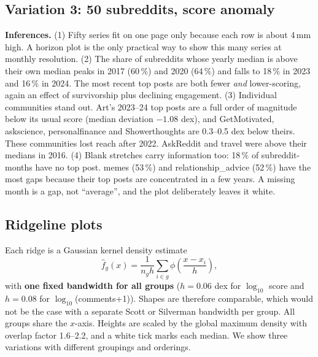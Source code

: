 \subsection{Variation 3: 50 subreddits, score anomaly}

\textbf{Inferences.}
(1) Fifty series fit on one page only because each row is about 4\,mm high. A horizon plot is the only practical way to
show this many series at monthly resolution.
(2) The share of subreddits whose yearly median is above their own median peaks in 2017 (60\,\%) and 2020 (64\,\%) and falls
to 18\,\% in 2023 and 16\,\% in 2024. The most recent top posts are both fewer \emph{and} lower-scoring, again an effect of
survivorship plus declining engagement.
(3) Individual communities stand out. Art's 2023--24 top posts are a full order of magnitude below its usual score (median
deviation $-1.08$ dex), and GetMotivated, askscience, personalfinance and Showerthoughts are 0.3--0.5 dex below theirs.
These communities lost reach after 2022. AskReddit and travel were above their medians in 2016.
(4) Blank stretches carry information too: 18\,\% of subreddit-months have no top post. memes (53\,\%) and
relationship\_advice (52\,\%) have the most gaps because their top posts are concentrated in a few years. A missing month is
a gap, not ``average'', and the plot deliberately leaves it white.

\subsection{Ridgeline plots}
Each ridge is a Gaussian kernel density estimate~\cite{silverman1986}
\begin{equation}
\hat f_g(x)=\frac{1}{n_g h}\sum_{i\in g}\phi\!\left(\frac{x-x_i}{h}\right),
\end{equation}
with \textbf{one fixed bandwidth for all groups} ($h=0.06$ dex for $\log_{10}$ score and $h=0.08$ for $\log_{10}$(comments+1)).
Shapes are therefore comparable, which would not be the case with a separate Scott or Silverman bandwidth per group. All
groups share the $x$-axis. Heights are scaled by the global maximum density with overlap factor 1.6--2.2, and a white tick
marks each median. We show three variations with different groupings and orderings.


